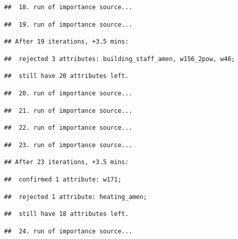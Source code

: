 \documentclass[
]{article}
\begin{document}
\begin{verbatim}
##  18. run of importance source...
\end{verbatim}

\begin{verbatim}
##  19. run of importance source...
\end{verbatim}

\begin{verbatim}
## After 19 iterations, +3.5 mins:
\end{verbatim}

\begin{verbatim}
##  rejected 3 attributes: building_staff_amen, w156_2pow, w46;
\end{verbatim}

\begin{verbatim}
##  still have 20 attributes left.
\end{verbatim}

\begin{verbatim}
##  20. run of importance source...
\end{verbatim}

\begin{verbatim}
##  21. run of importance source...
\end{verbatim}

\begin{verbatim}
##  22. run of importance source...
\end{verbatim}

\begin{verbatim}
##  23. run of importance source...
\end{verbatim}

\begin{verbatim}
## After 23 iterations, +3.5 mins:
\end{verbatim}

\begin{verbatim}
##  confirmed 1 attribute: w171;
\end{verbatim}

\begin{verbatim}
##  rejected 1 attribute: heating_amen;
\end{verbatim}

\begin{verbatim}
##  still have 18 attributes left.
\end{verbatim}

\begin{verbatim}
##  24. run of importance source...
\end{verbatim}
\end{document}
